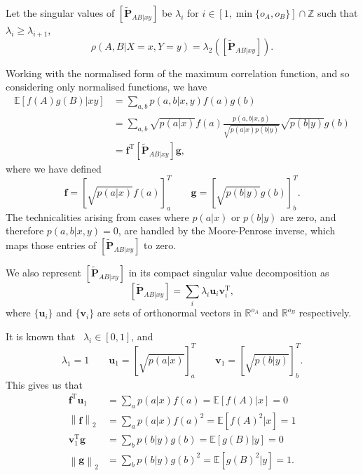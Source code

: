 \documentclass[10pt, a4paper]{article}
\newcommand{\norm}[1]{\left\lVert#1\right\rVert}
\newcommand{\?}{\mathrel{?}} %
\newcommand{\Z}{\mathbb{Z}} %
\newcommand{\R}{\mathbb{R}} %
\newcommand{\cvec}[1]{\boldsymbol{\mathbf{#1}}}    %
\newcommand{\rvec}[1]{\boldsymbol{\mathbf{#1}}^{\mathrm{T}}} %
\newcommand{\matrp}[2]{\left[\mathbf{#1}#2\right]} %
\newcommand{\E}{\mathbb{E}} %
\numberwithin{equation}{section} %
\theoremstyle{definition}
\theoremstyle{plain}
\theoremstyle{plain}
\begin{document}
    Let the singular values of \(\matrp{\tilde{P}}{_{AB|xy}}\) be \(\lambda_i\) for \(i \in [1, \min\{o_A, o_B\}] \cap \Z\) such that \(\lambda_{i} \geq \lambda_{i+1}\),
    \begin{equation}
      \rho(A,B|X=x,Y=y) = \lambda_2\left( \matrp{\tilde{P}}{_{AB|xy}} \right).
    \end{equation}

    Working with the normalised form of the maximum correlation function, and so considering only normalised functions, we have
    \begin{align}
      \E[f(A)g(B)|xy] &= \sum_{a,b} p(a,b|x,y) f(a)g(b) \\
                      &= \sum_{a,b} \sqrt{p(a|x)} f(a) \frac{p(a,b|x,y)}{\sqrt{p(a|x)p(b|y)}} \sqrt{p(b|y)} g(b) \\
                      &= \rvec{f} \matrp{\tilde{P}}{_{AB|xy}} \cvec{g},
    \end{align}
    where we have defined
    \begin{equation}
      \cvec{f} = {[\sqrt{p(a|x)} f(a)]}^T_a \qquad \cvec{g} = {[\sqrt{p(b|y)} g(b)]}^T_b.
    \end{equation}
    The technicalities arising from cases where \(p(a|x)\) or \(p(b|y)\) are zero, and therefore \(p(a,b|x,y) = 0\), are handled by the Moore-Penrose inverse, which maps those entries of \(\matrp{\tilde{P}}{_{AB|xy}}\) to zero.

    We also represent \(\matrp{\tilde{P}}{_{AB|xy}}\) in its compact singular value decomposition as
    \begin{equation}
      \matrp{\tilde{P}}{_{AB|xy}} = \sum_i \lambda_i \cvec{u}_i \rvec{v}_i,
    \end{equation}
    where \(\{\cvec{u}_i\}\) and \(\{\cvec{v}_i\}\) are sets of orthonormal vectors in \(\R^{o_A}\) and \(\R^{o_B}\) respectively.

    It is known that~\cite[Thm 1]{ComputingMaxCorr} \(\lambda_i \in [0, 1]\), and
    \begin{equation}
      \lambda_1 = 1 \qquad \cvec{u}_1 = {[\sqrt{p(a|x)}]}_a^T \qquad \cvec{v}_1 = {[\sqrt{p(b|y)}]}_b^T.
    \end{equation}
    This gives us that
    \begin{align}
      \rvec{f} \cvec{u}_1 &= \sum_a p(a|x) f(a) = \E[f(A)|x] = 0 \\
      \norm{\cvec{f}}_2 &= \sum_a p(a|x) {f(a)}^2 = \E[{f(A)}^2|x] = 1 \\
      \rvec{v}_1 \cvec{g} &= \sum_b p(b|y) g(b) = \E[g(B)|y] = 0 \\
      \norm{\cvec{g}}_2 &= \sum_b p(b|y) {g(b)}^2 = \E[{g(B)}^2|y] = 1.
    \end{align}
\end{document}
